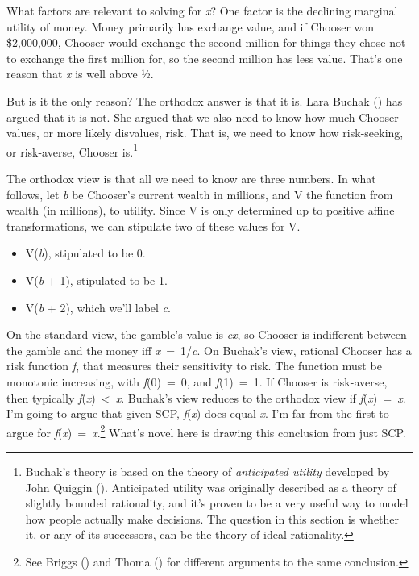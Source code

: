 \documentclass[
  10pt,
  letterpaper,
  DIV=11,
  numbers=noendperiod,
  twoside]{scrartcl}
\providecommand{\tightlist}{%
  \setlength{\itemsep}{0pt}\setlength{\parskip}{0pt}}\usepackage{longtable,booktabs,array}
\begin{document}
What factors are relevant to solving for \emph{x}? One factor is the
declining marginal utility of money. Money primarily has exchange value,
and if Chooser won \$2,000,000, Chooser would exchange the second
million for things they chose not to exchange the first million for, so
the second million has less value. That's one reason that \emph{x} is
well above ½.

But is it the only reason? The orthodox answer is that it is. Lara
Buchak () has argued that it is not. She
argued that we also need to know how much Chooser values, or more likely
disvalues, risk. That is, we need to know how risk-seeking, or
risk-averse, Chooser is.\footnote{Buchak's theory is based on the theory
  of \emph{anticipated utility} developed by John Quiggin
  (). Anticipated utility was originally
  described as a theory of slightly bounded rationality, and it's proven
  to be a very useful way to model how people actually make decisions.
  The question in this section is whether it, or any of its successors,
  can be the theory of ideal rationality.}

The orthodox view is that all we need to know are three numbers. In what
follows, let \emph{b} be Chooser's current wealth in millions, and V the
function from wealth (in millions), to utility. Since V is only
determined up to positive affine transformations, we can stipulate two
of these values for V.

\begin{itemize}
\tightlist
\item
  V(\emph{b}), stipulated to be 0.
\item
  V(\emph{b} + 1), stipulated to be 1.
\item
  V(\emph{b} + 2), which we'll label \emph{c}.
\end{itemize}

On the standard view, the gamble's value is \emph{cx}, so Chooser is
indifferent between the gamble and the money iff \emph{x}~=~1/\emph{c}.
On Buchak's view, rational Chooser has a risk function \emph{f}, that
measures their sensitivity to risk. The function must be monotonic
increasing, with \emph{f}(0)~=~0, and \emph{f}(1)~=~1. If Chooser is
risk-averse, then typically \emph{f}(\emph{x})~\textless~\emph{x}.
Buchak's view reduces to the orthodox view if
\emph{f}(\emph{x})~=~\emph{x}. I'm going to argue that given SCP,
\emph{f}(\emph{x}) does equal \emph{x}. I'm far from the first to argue
for \emph{f}(\emph{x})~=~\emph{x}.\footnote{See Briggs
  () and Thoma
  () for different arguments to the same
  conclusion.} What's novel here is drawing this conclusion from just
SCP.
\end{document}
